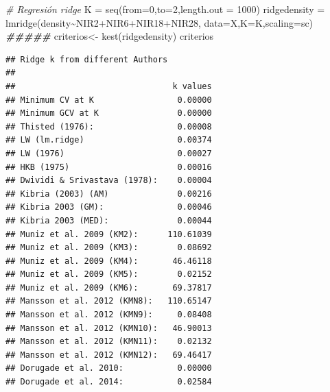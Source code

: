\documentclass[
]{article}
\newenvironment{Shaded}{\begin{snugshade}}{\end{snugshade}}
\newcommand{\AttributeTok}[1]{\textcolor[rgb]{0.77,0.63,0.00}{#1}}
\newcommand{\CommentTok}[1]{\textcolor[rgb]{0.56,0.35,0.01}{\textit{#1}}}
\newcommand{\DecValTok}[1]{\textcolor[rgb]{0.00,0.00,0.81}{#1}}
\newcommand{\DocumentationTok}[1]{\textcolor[rgb]{0.56,0.35,0.01}{\textbf{\textit{#1}}}}
\newcommand{\FunctionTok}[1]{\textcolor[rgb]{0.00,0.00,0.00}{#1}}
\newcommand{\NormalTok}[1]{#1}
\newcommand{\OtherTok}[1]{\textcolor[rgb]{0.56,0.35,0.01}{#1}}
\newcommand{\SpecialCharTok}[1]{\textcolor[rgb]{0.00,0.00,0.00}{#1}}
\newcommand{\StringTok}[1]{\textcolor[rgb]{0.31,0.60,0.02}{#1}}
\begin{document}
\begin{Shaded}
\begin{Highlighting}[]
\CommentTok{\# Regresión ridge}
\NormalTok{K }\OtherTok{=} \FunctionTok{seq}\NormalTok{(}\AttributeTok{from=}\DecValTok{0}\NormalTok{,}\AttributeTok{to=}\DecValTok{2}\NormalTok{,}\AttributeTok{length.out =} \DecValTok{1000}\NormalTok{)}
\NormalTok{ridgedensity }\OtherTok{=} \FunctionTok{lmridge}\NormalTok{(density}\SpecialCharTok{\textasciitilde{}}\NormalTok{NIR2}\SpecialCharTok{+}\NormalTok{NIR6}\SpecialCharTok{+}\NormalTok{NIR18}\SpecialCharTok{+}\NormalTok{NIR28,}
                       \AttributeTok{data=}\NormalTok{X,}\AttributeTok{K=}\NormalTok{K,}\AttributeTok{scaling=}\StringTok{\textquotesingle{}sc\textquotesingle{}}\NormalTok{)}
\DocumentationTok{\#\#\#\#\#}
\NormalTok{criterios}\OtherTok{\textless{}{-}} \FunctionTok{kest}\NormalTok{(ridgedensity)}
\NormalTok{criterios}
\end{Highlighting}
\end{Shaded}

\begin{verbatim}
## Ridge k from different Authors
## 
##                                k values
## Minimum CV at K                 0.00000
## Minimum GCV at K                0.00000
## Thisted (1976):                 0.00008
## LW (lm.ridge)                   0.00374
## LW (1976)                       0.00027
## HKB (1975)                      0.00016
## Dwividi & Srivastava (1978):    0.00004
## Kibria (2003) (AM)              0.00216
## Kibria 2003 (GM):               0.00046
## Kibria 2003 (MED):              0.00044
## Muniz et al. 2009 (KM2):      110.61039
## Muniz et al. 2009 (KM3):        0.08692
## Muniz et al. 2009 (KM4):       46.46118
## Muniz et al. 2009 (KM5):        0.02152
## Muniz et al. 2009 (KM6):       69.37817
## Mansson et al. 2012 (KMN8):   110.65147
## Mansson et al. 2012 (KMN9):     0.08408
## Mansson et al. 2012 (KMN10):   46.90013
## Mansson et al. 2012 (KMN11):    0.02132
## Mansson et al. 2012 (KMN12):   69.46417
## Dorugade et al. 2010:           0.00000
## Dorugade et al. 2014:           0.02584
\end{verbatim}
\end{document}
